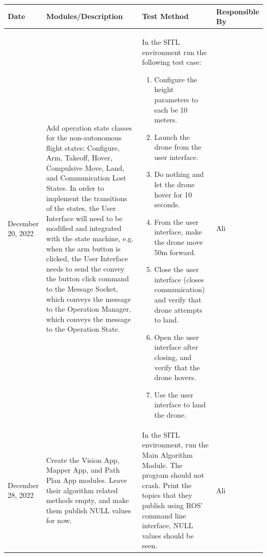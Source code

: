 \documentclass[12pt, titlepage]{article}
\begin{document}
\begin{table}[!h]
\begin{center}
\begin{tabular}{ | m{2.5cm} | m{5cm} | m{5.5cm} | m{2cm} | } 
\hline
Date & Modules/Description & Test Method & Responsible By \\
\hline
December 20, 2022 & Add operation state classes for the non-autonomous flight states: Configure, Arm, Takeoff, Hover, Compulsive Move, Land, and Communication Lost States. In order to implement the transitions of the states, the User Interface will need to be modified and integrated with the state machine, e.g. when the arm button is clicked, the User Interface needs to send the convey the button click command to the Message Socket, which conveys the message to the Operation Manager, which conveys the message to the Operation State. & 
    In the SITL environment run the following test case: 
    \begin{enumerate}
    \item Configure the height parameters to each be 10 meters.
    \item Launch the drone from the user interface.
    \item Do nothing and let the drone hover for 10 seconds.
    \item From the user interface, make the drone move 50m forward.
    \item Close the user interface (closes communication) and verify that drone attempts to land.
    \item Open the user interface after closing, and verify that the drone hovers.
    \item Use the user interface to land the drone.
    \end{enumerate}
    & Ali \\
\hline
December 28, 2022 & Create the Vision App, Mapper App, and Path Plan App modules. Leave their algorithm related methods empty, and make them publish NULL values for now. & 
    In the SITL environment, run the Main Algorithm Module. The program should not crash. Print the topics that they publish using ROS' command line interface, NULL values should be seen. & Ali \\
\hline
\end{tabular}
\end{center}
\end{table}
\end{document}
